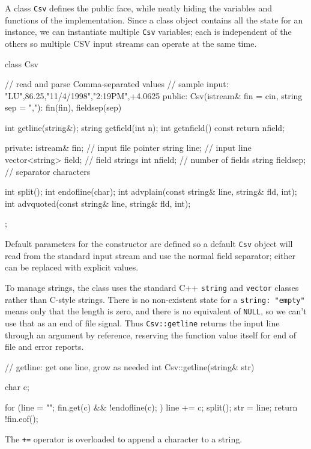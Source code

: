 A class \verb'Csv' defines the public face, while neatly hiding the
variables and functions of the implementation. Since a class object
contains all the state for an instance, we can instantiate multiple
\verb'Csv' variables; each is independent of the others so multiple CSV
input streams can operate at the same time.
\begin{wellcode}
    class Csv { // read and parse Comma-separated values
        // sample input: "LU",86.25,"11/4/1998","2:19PM",+4.0625
        public:
            Csv(istream& fin = cin, string sep = ","):
                fin(fin), fieldsep(sep) {}

            int getline(string&);
            string getfield(int n);
            int getnfield() const { return nfield; }

        private:
            istream& fin;           // input file pointer
            string line;            // input line
            vector<string> field;   // field strings
            int nfield;             // number of fields
            string fieldsep;        // separator characters

            int split();
            int endofline(char);
            int advplain(const string& line, string& fld, int);
            int advquoted(const string& line, string& fld, int);
    };
\end{wellcode}
Default parameters for the constructor are defined so a default \verb'Csv'
object will read from the standard input stream and use the normal field
separator; either can be replaced with explicit values.

To manage strings, the class uses the standard C++ \verb'string' and
\verb'vector' classes rather than C-style strings. There is no non-existent
state for a \verb'string: "empty"' means only that the length is zero, and
there is no equivalent of \verb'NULL', so we can't use that as an end of
file signal. Thus \verb'Csv::getline' returns the input line through an
argument by reference, reserving the function value itself for end of file
and error reports.
\begin{wellcode}
    // getline: get one line, grow as needed
    int Csv::getline(string& str)
    {
        char    c;

        for (line = ""; fin.get(c) && !endofline(c); )
            line += c;
        split();
        str = line;
        return !fin.eof();
    }
\end{wellcode}
The \verb'+=' operator is overloaded to append a character to a string.

